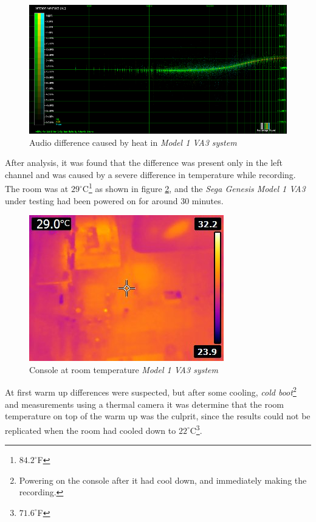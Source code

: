\documentclass[10pt,a4paper]{report}
\begin{document}
\begin{appendices}
\begin{figure}[H]
	\centering
	\includegraphics[width=1.0\linewidth]{images/heat/0-plotheat.png}
	\caption[Heat Difference]{Audio difference caused by heat in \textit{Model 1 VA3 system}}
	\label{fig:heatdiff}
\end{figure}

After analysis, it was found that the difference was present only in the left channel and was caused by a severe difference in temperature while recording. The room was at $29^\circ$C\footnote{$84.2^\circ$F} as shown in figure \ref{fig:heatroomtemp}, and the \textit{Sega Genesis Model 1 VA3} under testing had been powered on for around 30 minutes.

\begin{figure}[H]
	\centering
	\includegraphics[width=0.4\linewidth]{images/heat/1-roomtemp.jpg}
	\caption[Room temperature]{Console at room temperature \textit{Model 1 VA3 system}}
	\label{fig:heatroomtemp}
\end{figure}

At first warm up differences were suspected, but after some cooling, \textit{cold boot}\footnote{Powering on the console after it had cool down, and immediately making the recording.} and measurements using a thermal camera it was determine that the room temperature on top of the warm up was the culprit, since the results could not be replicated when the room had cooled down to $22^\circ$C\footnote{$71.6^\circ$F}. 


\end{appendices}
\end{document}
